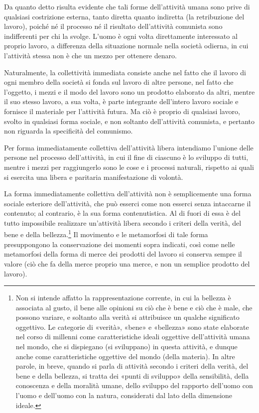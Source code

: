 \documentclass[12pt,a4paper,openany]{book}
\begin{document}
Da quanto detto risulta evidente che tali forme dell'attività umana sono prive di qualsiasi costrizione esterna, tanto diretta quanto indiretta (la retribuzione del lavoro), poiché né il processo né il risultato dell'attività comunista sono indifferenti per chi la svolge. L'uomo è ogni volta direttamente interessato al proprio lavoro, a differenza della situazione normale nella società odierna, in cui l'attività stessa non è che un mezzo per ottenere denaro.

Naturalmente, la collettività immediata consiste anche nel fatto che il lavoro di ogni membro della società si fonda sul lavoro di altre persone, nel fatto che l'oggetto, i mezzi e il modo del lavoro sono un prodotto elaborato da altri, mentre il suo stesso lavoro, a sua volta, è parte integrante dell'intero lavoro sociale e fornisce il materiale per l'attività futura. Ma ciò è proprio di qualsiasi lavoro, svolto in qualsiasi forma sociale, e non soltanto dell'attività comunista, e pertanto non riguarda la specificità del comunismo.

Per forma immediatamente collettiva dell'attività libera intendiamo l'unione delle persone nel processo dell'attività, in cui il fine di ciascuno è lo sviluppo di tutti, mentre i mezzi per raggiungerlo sono le cose e i processi naturali, rispetto ai quali si esercita una libera e paritaria manifestazione di volontà.

La forma immediatamente collettiva dell'attività non è semplicemente una forma sociale esteriore dell'attività, che può esserci come non esserci senza intaccarne il contenuto; al contrario, è la sua forma contenutistica. Al di fuori di essa è del tutto impossibile realizzare un'attività libera secondo i criteri della verità, del bene e della bellezza.\footnote{Non si intende affatto la rappresentazione corrente, in cui la bellezza è associata al gusto, il bene alle opinioni su ciò che è bene e ciò che è male, che possono variare, e soltanto alla verità si attribuisce un qualche significato oggettivo. Le categorie di «verità», «bene» e «bellezza» sono state elaborate nel corso di millenni come caratteristiche ideali oggettive dell'attività umana nel mondo, che si dispiegano (si sviluppano) in questa attività, e dunque anche come caratteristiche oggettive del mondo (della materia). In altre parole, in breve, quando si parla di attività secondo i criteri della verità, del bene e della bellezza, si tratta dei «punti di sviluppo» della sensibilità, della conoscenza e della moralità umane, dello sviluppo del rapporto dell'uomo con l'uomo e dell'uomo con la natura, considerati dal lato della dimensione ideale.} Il movimento e le metamorfosi di tale forma presuppongono la conservazione dei momenti sopra indicati, così come nelle metamorfosi della forma di merce dei prodotti del lavoro si conserva sempre il valore (ciò che fa della merce proprio una merce, e non un semplice prodotto del lavoro).
\end{document}
